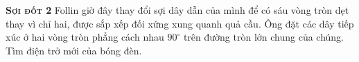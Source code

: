 
\begin{problem}{\textbf{\textsc{Sợi đốt 2}}\hspace{1mm}}
	Follin giờ đây thay đổi sợi dây dẫn của mình để có sáu vòng tròn dẹt thay vì chỉ hai, được sắp xếp đối xứng xung quanh quả cầu. Ông đặt các dây tiếp xúc ở hai vòng tròn phẳng cách nhau $90^\circ$ trên đường tròn lớn chung của chúng. Tìm điện trở mới của bóng đèn.   
\end{problem}
